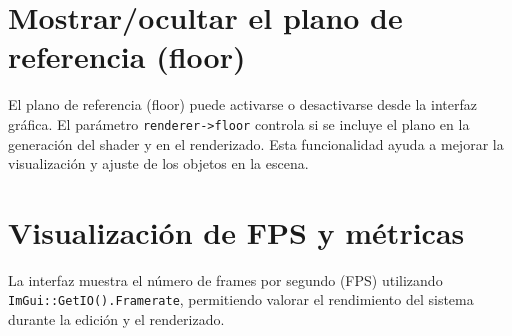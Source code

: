 \section{Mostrar/ocultar el plano de referencia (floor)}

El plano de referencia (floor) puede activarse o desactivarse desde la interfaz
gráfica. El parámetro \texttt{renderer->floor} controla si se incluye el plano
en la generación del shader y en el renderizado. Esta funcionalidad ayuda a
mejorar la visualización y ajuste de los objetos en la escena.

\section{Visualización de FPS y métricas}

La interfaz muestra el número de frames por segundo (FPS) utilizando
\texttt{ImGui::GetIO().Framerate}, permitiendo valorar el rendimiento del
sistema durante la edición y el renderizado.
